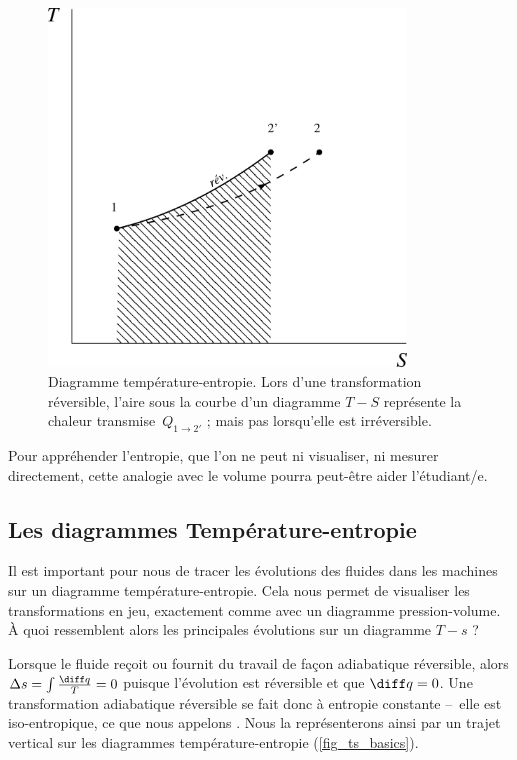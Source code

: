 		\begin{figure}
			\begin{center}
				\includegraphics[width=9.5cm]{images/ts_reversible_irreversible.png}
			\end{center}
			\caption{Diagramme température-entropie. Lors d’une transformation réversible, l’aire sous la courbe d’un diagramme $T-S$ représente la chaleur transmise~$Q_{1 \to 2'}$ ; mais pas lorsqu’elle est irréversible.}
			\label{fig_ts_reversible_irreversible}
		\end{figure}

		Pour appréhender l’entropie, que l’on ne peut ni visualiser, ni mesurer directement, cette analogie avec le volume pourra peut-être aider l’étudiant/e.


 
	
	\subsection{Les diagrammes Température-entropie}
	
		Il est important pour nous de tracer les évolutions des fluides dans les machines sur un diagramme température-entropie. Cela nous permet de visualiser les transformations en jeu, exactement comme avec un diagramme pression-volume. À quoi ressemblent alors les principales évolutions sur un diagramme $T-s$ ?

		Lorsque le fluide reçoit ou fournit du travail de façon adiabatique réversible, alors $\Delta s = \int \frac{\diff q}{T} = 0$ puisque l’évolution est réversible et que $\diff q = 0$. Une transformation adiabatique réversible se fait donc à entropie constante --\ elle est iso-entropique, ce que nous appelons . Nous la représenterons ainsi par un trajet vertical sur les diagrammes température-entropie (\cref{fig_ts_basics}).

